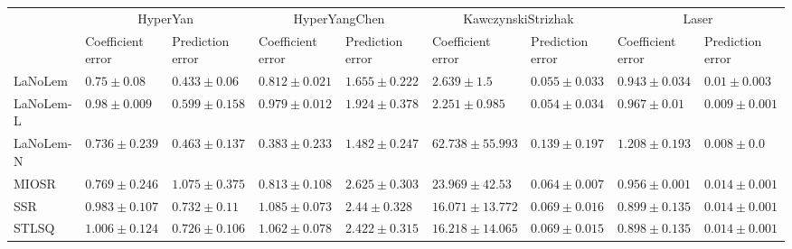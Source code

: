 \begin{table*}
{\begin{tabular}{lllllllll}
 & \multicolumn{2}{c}{HyperYan} & \multicolumn{2}{c}{HyperYangChen} & \multicolumn{2}{c}{KawczynskiStrizhak} & \multicolumn{2}{c}{Laser} \\
 & Coefficient error & Prediction error & Coefficient error & Prediction error & Coefficient error & Prediction error & Coefficient error & Prediction error \\
\midrule
LaNoLem & $0.75\pm 0.08$ & $\mathbf{0.433}\pm 0.06$ & $0.812\pm 0.021$ & $1.655\pm 0.222$ & $2.639\pm 1.5$ & $0.055\pm 0.033$ & $0.943\pm 0.034$ & $0.01\pm 0.003$ \\
LaNoLem-L & $0.98\pm 0.009$ & $0.599\pm 0.158$ & $0.979\pm 0.012$ & $1.924\pm 0.378$ & $\mathbf{2.251}\pm 0.985$ & $\mathbf{0.054}\pm 0.034$ & $0.967\pm 0.01$ & $0.009\pm 0.001$ \\
LaNoLem-N & $\mathbf{0.736}\pm 0.239$ & $0.463\pm 0.137$ & $\mathbf{0.383}\pm 0.233$ & $\mathbf{1.482}\pm 0.247$ & $62.738\pm 55.993$ & $0.139\pm 0.197$ & $1.208\pm 0.193$ & $\mathbf{0.008}\pm 0.0$ \\
MIOSR & $0.769\pm 0.246$ & $1.075\pm 0.375$ & $0.813\pm 0.108$ & $2.625\pm 0.303$ & $23.969\pm 42.53$ & $0.064\pm 0.007$ & $0.956\pm 0.001$ & $0.014\pm 0.001$ \\
SSR & $0.983\pm 0.107$ & $0.732\pm 0.11$ & $1.085\pm 0.073$ & $2.44\pm 0.328$ & $16.071\pm 13.772$ & $0.069\pm 0.016$ & $0.899\pm 0.135$ & $0.014\pm 0.001$ \\
STLSQ & $1.006\pm 0.124$ & $0.726\pm 0.106$ & $1.062\pm 0.078$ & $2.422\pm 0.315$ & $16.218\pm 14.065$ & $0.069\pm 0.015$ & $\mathbf{0.898}\pm 0.135$ & $0.014\pm 0.001$ \\

\midrule


\end{tabular}}
\end{table*}
